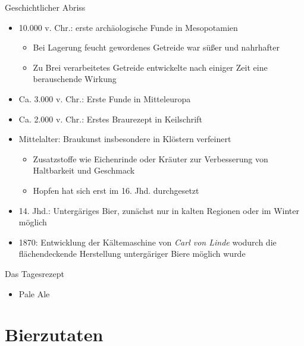 \documentclass[9pt, ngerman]{beamer}
\begin{document}
\begin{frame}{Geschichtlicher Abriss}
  \begin{itemize}
  	\item 10.000 v. Chr.: erste archäologische Funde in Mesopotamien
  	\begin{itemize}
  		\item Bei Lagerung feucht gewordenes Getreide war süßer und nahrhafter
  		\item Zu Brei verarbeitetes Getreide entwickelte nach einiger Zeit eine berauschende Wirkung
  	\end{itemize}
  	\item Ca. 3.000 v. Chr.: Erste Funde in Mitteleuropa
  	\item Ca. 2.000 v. Chr.: Erstes Braurezept in Keilschrift
  	\item Mittelalter: Braukunst insbesondere in Klöstern verfeinert
  	\begin{itemize}
  		\item Zusatzstoffe wie Eichenrinde oder Kräuter zur Verbesserung von Haltbarkeit und Geschmack
  		\item Hopfen hat sich erst im 16. Jhd. durchgesetzt
  	\end{itemize}
  	\item 14. Jhd.: Untergäriges Bier, zunächst nur in kalten Regionen oder im Winter möglich
  	\item 1870: Entwicklung der Kältemaschine von \emph{Carl von Linde} wodurch die flächendeckende Herstellung untergäriger Biere möglich wurde
  \end{itemize}
\end{frame}
\begin{frame}{Das Tagesrezept}
  \begin{itemize}
    \item Pale Ale
  \end{itemize}
\end{frame}

\section{Bierzutaten}
\end{document}
